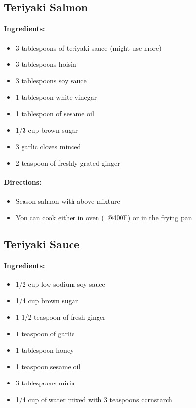 \documentclass{article}
\begin{document}
\subsection{Teriyaki Salmon}

\paragraph{Ingredients:}
\begin{itemize}
    \item 3 tablespoons of teriyaki sauce (might use more)
    \item 3 tablespoons hoisin
    \item 3 tablespoons soy sauce
    \item 1 tablespoon white vinegar
    \item 1 tablespoon of sesame oil
    \item 1/3 cup brown sugar
    \item 3 garlic cloves minced
    \item 2 teaspoon of freshly grated ginger
\end{itemize}

\paragraph{Directions:}
\begin{itemize}
    \item Season salmon with above mixture
    \item You can cook either in oven (~@400F) or in the frying pan
\end{itemize}

\subsection{Teriyaki Sauce}

\paragraph{Ingredients:}
\begin{itemize}
    \item 1/2 cup low sodium soy sauce
    \item 1/4 cup brown sugar
    \item 1 1/2 teaspoon of fresh ginger
    \item 1 teaspoon of garlic
    \item 1 tablespoon honey
    \item 1 teaspoon sesame oil
    \item 3 tablespoons mirin
    \item 1/4 cup of water mixed with 3 teaspoons cornstarch
\end{itemize}
\end{document}
